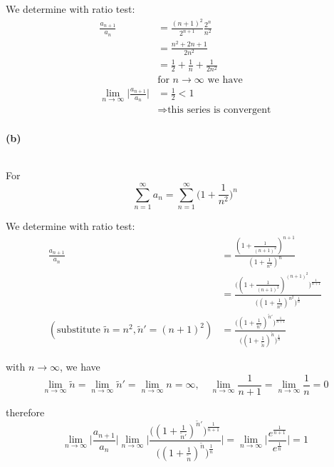 We determine with ratio test:
\begin{align*}
\frac{a_{n+1}}{a_n}
&=\frac{(n+1)^2}{2^{n+1}}\frac{2^n}{n^2}\\
&=\frac{n^2+2n+1}{2n^2}\\
&=\frac{1}{2}+\frac{1}{n}+\frac{1}{2n^2}\\
&\mbox{for }n\rightarrow\infty\mbox{ we have}\\
\lim_{n\rightarrow\infty}\Bigg|\frac{a_{n+1}}{a_n}\Bigg|&=\frac{1}{2}<1\\
&\Rightarrow\mbox{this series is convergent}
\end{align*}

\paragraph{(b)}
$ $\newline

For
\begin{equation*}
\sum_{n=1}^{\infty}a_n=\sum_{n=1}^{\infty}\Big(1+\frac{1}{n^2}\Big)^n
\end{equation*}

We determine with ratio test:
\begin{align*}
\frac{a_{n+1}}{a_n}
&=\frac{(1+\frac{1}{(n+1)^2})^{n+1}}{(1+\frac{1}{n^2})^n}\\
&=\frac{\Big((1+\frac{1}{(n+1)^2})^{(n+1)^2}\Big)^{\frac{1}{n+1}}}{\Big((1+\frac{1}{n^2})^{n^2}\Big)^\frac{1}{n}}\\
(\mbox{substitute }\tilde{n}=n^2,\tilde{n}'=(n+1)^2)&=
\frac{\Big((1+\frac{1}{\tilde{n}'})^{\tilde{n}'}\Big)^{\frac{1}{n+1}}}{\Big((1+\frac{1}{\tilde{n}})^{\tilde{n}}\Big)^\frac{1}{n}}
\end{align*}

with $n\rightarrow\infty$, we have
\begin{equation*}
\lim_{n\rightarrow\infty}\tilde{n}=\lim_{n\rightarrow\infty}\tilde{n}'=\lim_{n\rightarrow\infty}n=\infty,\hspace{1em}\lim_{n\rightarrow\infty}\frac{1}{n+1}=\lim_{n\rightarrow\infty}\frac{1}{n}=0
\end{equation*}

therefore
\begin{equation*}
\lim_{n\rightarrow\infty}\Bigg|\frac{a_{n+1}}{a_n}\Bigg|
\lim_{n\rightarrow\infty}\Bigg|\frac{\Big((1+\frac{1}{\tilde{n}'})^{\tilde{n}'}\Big)^{\frac{1}{n+1}}}{\Big((1+\frac{1}{\tilde{n}})^{\tilde{n}}\Big)^\frac{1}{n}}\Bigg|=\lim_{n\rightarrow\infty}\Bigg|\frac{e^{\frac{1}{n+1}}}{e^\frac{1}{n}}\Bigg|=1
\end{equation*}

